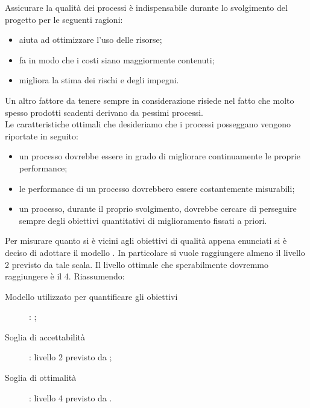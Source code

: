 		  \label{subsec:obiettiviprocesso}
			Assicurare la qualità dei processi è indispensabile durante lo svolgimento del progetto per le seguenti ragioni:
			\begin{itemize}
				\item aiuta ad ottimizzare l'uso delle risorse;
				\item fa in modo che i costi siano maggiormente contenuti;
				\item migliora la stima dei rischi e degli impegni.
			\end{itemize}
			Un altro fattore da tenere sempre in considerazione risiede nel fatto che molto spesso prodotti scadenti derivano da pessimi processi.\\
			Le caratteristiche ottimali che desideriamo che i processi posseggano vengono riportate in seguito:
			\begin{itemize}
				\item un processo dovrebbe essere in grado di migliorare continuamente le proprie performance;
				\item le performance di un processo dovrebbero essere costantemente misurabili;
				\item un processo, durante il proprio svolgimento, dovrebbe cercare di perseguire sempre degli obiettivi quantitativi di miglioramento fissati a priori.
			\end{itemize}
			Per misurare quanto si è vicini agli obiettivi di qualità appena enunciati si è deciso di adottare il modello . In particolare si vuole raggiungere almeno il livello 2 previsto da tale scala. Il livello ottimale che sperabilmente dovremmo raggiungere è il 4. Riassumendo:
			\begin{description}
				\item[Modello utilizzato per quantificare gli obiettivi]: ;
				\item[Soglia di accettabilità]: livello 2 previsto da ;
				\item[Soglia di ottimalità]: livello 4 previsto da .
			\end{description}

